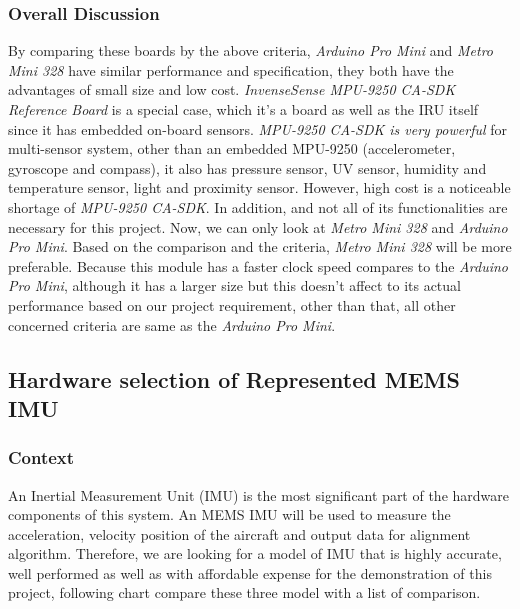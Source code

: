 \hfill \break
\subsubsection{Overall Discussion}
By comparing these boards by the above criteria, \textit{Arduino Pro Mini} and \textit{Metro Mini 328} have similar performance and specification, they both have the advantages of small size and low cost.
\textit{InvenseSense MPU-9250 CA-SDK Reference Board} is a special case, which it’s a board as well as the IRU itself since it has embedded on-board sensors.
\textit{MPU-9250 CA-SDK is very powerful} for multi-sensor system, other than an embedded MPU-9250 (accelerometer, gyroscope and compass), it also has pressure sensor, UV sensor, humidity and temperature sensor, light and proximity sensor.
However, high cost is a noticeable shortage of \textit{MPU-9250 CA-SDK}. In addition, and not all of its functionalities are necessary for this project.
Now, we can only look at \textit{Metro Mini 328} and \textit{Arduino Pro Mini}. Based on the comparison and the criteria, \textit{Metro Mini 328} will be more preferable.
Because this module has a faster clock speed compares to the \textit{Arduino Pro Mini}, although it has a larger size but this doesn’t affect to its actual performance based on our project requirement, other than that, all other concerned criteria are same as the \textit{Arduino Pro Mini}.



\subsection{Hardware selection of Represented MEMS IMU}
\subsubsection{Context}
An Inertial Measurement Unit (IMU) is the most significant part of the hardware components of this system.
An MEMS IMU will be used to measure the acceleration, velocity position of the aircraft and output data for alignment algorithm.
Therefore, we are looking for a model of IMU that is highly accurate, well performed as well as with affordable expense for the demonstration of this project, following chart compare these three model with a list of comparison.\\

